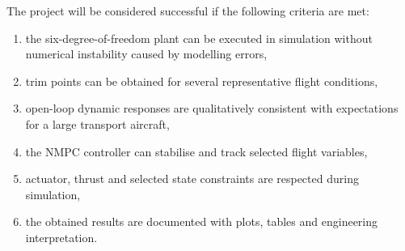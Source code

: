 The project will be considered successful if the following criteria are met:
\begin{enumerate}
    \item the six-degree-of-freedom plant can be executed in simulation without numerical instability caused by modelling errors,
    \item trim points can be obtained for several representative flight conditions,
    \item open-loop dynamic responses are qualitatively consistent with expectations for a large transport aircraft,
    \item the NMPC controller can stabilise and track selected flight variables,
    \item actuator, thrust and selected state constraints are respected during simulation,
    \item the obtained results are documented with plots, tables and engineering interpretation.
\end{enumerate}
